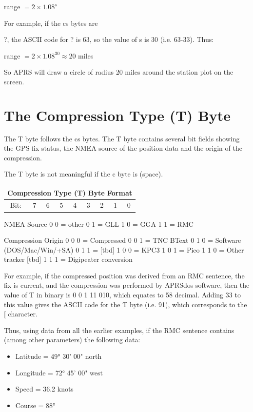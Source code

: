 range $ = 2 \times 1.08^{s} $

For example, if the cs bytes are {?, the ASCII code for ? is 63, so
  the value of s is 30 (i.e. 63-33). Thus:

range $ = 2 \times 1.08^{30} \approx 20 $ miles

So APRS will draw a circle of radius 20 miles around the station plot on the
screen.

\section{The Compression Type (T) Byte}

The T byte follows the cs bytes. The T byte contains several bit fields
showing the GPS fix status, the NMEA source of the position data and the
origin of the compression.

The T byte is not meaningful if the c byte is \textvisiblespace (space).


\begin{tabular}{c|c|c|c|c|c|c|c|c|}
  \hline
  \multicolumn {9}{|r|}{Compression Type (T) Byte Format} \\
  \hline
    Bit: & 7 & 6 & 5 & 4 & 3 & 2 & 1 & 0 \\
  \hline
\end{tabular}

NMEA Source
0 0 = other
0 1 = GLL
1 0 = GGA
1 1 = RMC


Compression Origin
0 0 0 = Compressed
0 0 1 = TNC BText
0 1 0 = Software (DOS/Mac/Win/+SA)
0 1 1 = [tbd]
1 0 0 = KPC3
1 0 1 = Pico
1 1 0 = Other tracker [tbd]
1 1 1 = Digipeater conversion

For example, if the compressed position was derived from an RMC sentence,
the fix is current, and the compression was performed by APRSdos software,
then the value of T in binary is 0 0 1 11 010, which equates to 58 decimal.
Adding 33 to this value gives the ASCII code for the T byte (i.e. 91), which
corresponds to the [ character.

Thus, using data from all the earlier examples, if the RMC sentence contains
(among other parameters) the following data:

\begin{itemize}
\item [] Latitude = 49° 30' 00" north
\item [] Longitude = 72° 45' 00" west
\item [] Speed = 36.2 knots
\item [] Course = 88°
\end{itemize}

}
